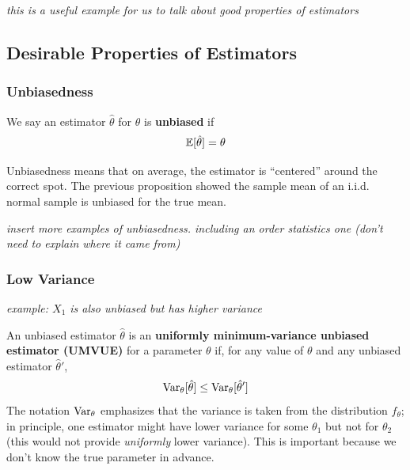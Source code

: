 \documentclass[../../../main.tex]{subfiles}
\begin{document}
\textit{this is a useful example for us to talk about good properties of estimators}

\subsection{Desirable Properties of Estimators}

\subsubsection{Unbiasedness}

\begin{definition}
    We say an estimator $\hat \theta$ for $\theta$ is \textbf{unbiased} if
    \begin{equation*}
        \mathbb{E}[\hat \theta]=\theta
    \end{equation*}
\end{definition}

Unbiasedness means that on average, the estimator is ``centered'' around the correct spot.
The previous proposition showed the sample mean of an i.i.d. normal sample is unbiased for the true mean.

\textit{insert more examples of unbiasedness. including an order statistics one (don't need to explain where it came from)}

\subsubsection{Low Variance}

\textit{example: $X_1$ is also unbiased but has higher variance}

\begin{definition}
    An unbiased estimator $\hat \theta$ is an \textbf{uniformly minimum-variance unbiased estimator (UMVUE)} for a parameter $\theta$ if, for any value of $\theta$ and any unbiased estimator $\hat \theta'$,
    \begin{equation*}
        \operatorname{Var}_\theta[\hat \theta]\leq \operatorname{Var}_\theta[\hat \theta']
    \end{equation*}
    The notation $\operatorname{Var}_\theta$ emphasizes that the variance is taken from the distribution $f_\theta$; in principle, one estimator might have lower variance for some $\theta_1$ but not for $\theta_2$ (this would not provide \textit{uniformly} lower variance).
    This is important because we don't know the true parameter in advance.
\end{definition}
\end{document}

